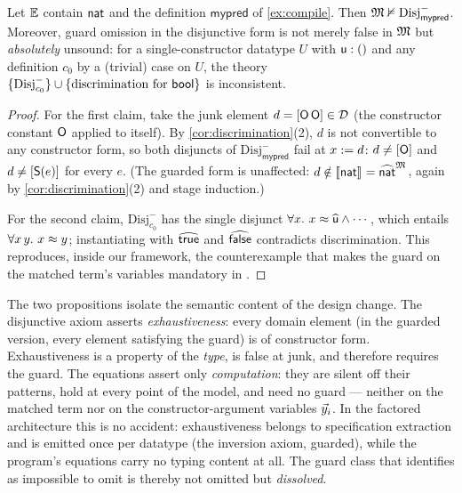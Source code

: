 \begin{proposition}
\label{prop:disj-guard}
Let $\mathbb{E}$ contain $\mathsf{nat}$ and the definition $\mathsf{mypred}$ of
\cref{ex:compile}.  Then $\mathfrak{M} \nvDash \mathrm{Disj}^-_{\mathsf{mypred}}$.
Moreover, guard omission in the disjunctive form is not merely false in
$\mathfrak{M}$ but \emph{absolutely} unsound: for a single-constructor datatype
$U$ with $\mathsf{u} : ()$ and any definition $c_0$ by a (trivial) case on
$U$, the theory $\{\mathrm{Disj}^-_{c_0}\} \cup \{\text{discrimination
for } \mathsf{bool}\}$ is inconsistent.
\end{proposition}

\begin{proof}
For the first claim, take the junk element $d = [\mathsf{O}\,\mathsf{O}] \in
\mathcal{D}$ (the constructor constant $\mathsf{O}$ applied to itself).  By
\cref{cor:discrimination}(2), $d$ is not convertible to any constructor
form, so both disjuncts of $\mathrm{Disj}^-_{\mathsf{mypred}}$ fail at $x
\mathrel{:=} d$: $d \neq [\mathsf{O}]$ and $d \neq [\mathsf{S}(e)]$ for every $e$.
(The guarded form is unaffected: $d \notin [\![ \mathsf{nat} ]\!]_{} =
\widehat{\mathsf{nat}}^{\mathfrak{M}}$, again by \cref{cor:discrimination}(2) and stage
induction.)

For the second claim, $\mathrm{Disj}^-_{c_0}$ has the single disjunct
$\forall x.\ x \approx \widehat{\mathsf{u}} \wedge \cdots$, which entails
$\forall x\,y.\ x \approx y$; instantiating with
$\widehat{\mathsf{true}}$ and $\widehat{\mathsf{false}}$ contradicts discrimination.
This reproduces, inside our framework, the counterexample that makes the
guard on the matched term's variables mandatory in
\cite[\S 5.6]{CzajkaKaliszyk2018}.
\end{proof}

The two propositions isolate the semantic content of the design change.
The disjunctive axiom asserts \emph{exhaustiveness}: every domain element
(in the guarded version, every element satisfying the guard) is of
constructor form.  Exhaustiveness is a property of the \emph{type}, is
false at junk, and therefore requires the guard.  The equations assert
only \emph{computation}: they are silent off their patterns, hold at
every point of the model, and need no guard --- neither on the matched
term nor on the constructor-argument variables $\vec{y}_i$.  In the
factored architecture this is no accident: exhaustiveness belongs to
specification extraction and is emitted once per datatype (the inversion
axiom, guarded), while the program's equations carry no typing content at
all.  The guard class that \cite[\S 5.6]{CzajkaKaliszyk2018} identifies
as impossible to omit is thereby not omitted but \emph{dissolved}.

